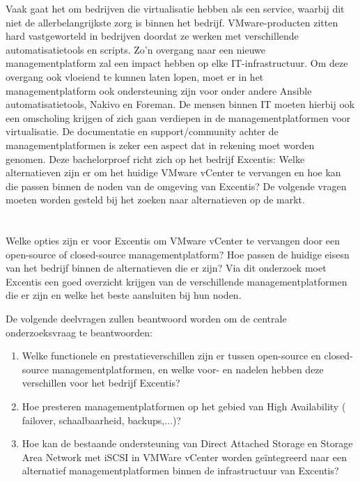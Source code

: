 Vaak gaat het om bedrijven die virtualisatie hebben als een service, waarbij dit niet de allerbelangrijkste zorg is binnen het bedrijf.
VMware-producten zitten hard vastgeworteld in bedrijven doordat ze werken met verschillende automatisatietools en scripts. Zo'n overgang naar een nieuwe managementplatform zal een impact hebben op elke IT-infrastructuur.
Om deze overgang ook vloeiend te kunnen laten lopen, moet er in het managementplatform ook ondersteuning zijn voor onder andere Ansible automatisatietools, Nakivo en Foreman.
De mensen binnen IT moeten hierbij ook een omscholing krijgen of zich gaan verdiepen in de managementplatformen  voor virtualisatie. De documentatie en support/community achter de managementplatformen is zeker een aspect dat in rekening moet worden genomen.
Deze bachelorproef richt zich op het bedrijf Excentis: Welke alternatieven zijn er om het huidige VMware vCenter te vervangen en hoe kan die passen binnen de noden van de omgeving van Excentis?
De volgende vragen moeten worden gesteld bij het zoeken naar alternatieven op de markt.


\section{}%
\label{sec:onderzoeksvraag}

Welke opties zijn er voor Excentis om VMware vCenter te vervangen door een open-source of closed-source managementplatform? Hoe passen de huidige eisesn van het bedrijf binnen de alternatieven die er zijn?
Via dit onderzoek moet Excentis een goed overzicht krijgen van de verschillende managementplatformen die er zijn en welke het beste aansluiten bij hun noden.

De volgende deelvragen zullen beantwoord worden om de centrale onderzoeksvraag te beantwoorden:
\begin{enumerate}
  \item Welke functionele en prestatieverschillen zijn er tussen open-source en closed-source managementplatformen, en welke voor- en nadelen hebben deze verschillen voor het bedrijf Excentis?
  \item Hoe presteren managementplatformen op het gebied van High Availability ( failover, \newline schaalbaarheid, backups,...)?
  \item Hoe kan de bestaande ondersteuning van Direct Attached Storage en Storage Area Network met iSCSI in VMWare vCenter worden geïntegreerd naar een alternatief managementplatformen binnen de infrastructuur van Excentis?
  \end{enumerate}
\newpage
